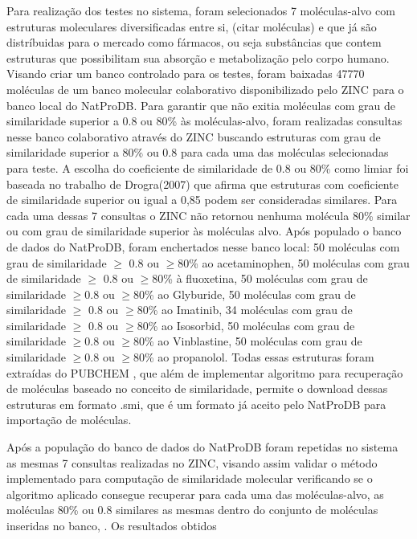 Para realização dos testes no sistema, foram selecionados 7 moléculas-alvo  com estruturas moleculares diversificadas entre si, (citar moléculas) e que já são distríbuidas para o mercado como fármacos, ou seja substâncias que contem estruturas que possibilitam sua absorção e metabolização pelo corpo humano. Visando criar um banco controlado para os testes, foram baixadas 47770 moléculas de um banco molecular colaborativo disponibilizado pelo ZINC \cite{irwin2005zinc} para o banco local do NatProDB. Para garantir que não exitia moléculas com grau de similaridade superior a 0.8 ou 80\% às moléculas-alvo, foram realizadas consultas nesse banco colaborativo através do ZINC buscando estruturas com grau de similaridade superior a 80\% ou 0.8 para cada uma das moléculas selecionadas para teste. A escolha do coeficiente de similaridade de 0.8 ou 80\% como limiar foi baseada no trabalho de Drogra(2007) que afirma que estruturas com coeficiente de similaridade superior ou igual a 0,85 podem ser consideradas similares. Para cada uma dessas 7 consultas o ZINC não retornou nenhuma molécula 80\% similar ou com grau de similaridade superior às moléculas alvo. Após populado o banco de dados do NatProDB, foram enchertados nesse banco local: 50 moléculas com grau de similaridade $\geq $ 0.8 ou $\geq $80\% ao acetaminophen, 50 moléculas com grau de similaridade $\geq $ 0.8 ou $\geq $80\% à fluoxetina, 50 moléculas com grau de similaridade $\geq $0.8 ou $\geq $80\% ao Glyburide, 50 moléculas com grau de similaridade $\geq $ 0.8 ou $\geq $80\% ao Imatinib, 34 moléculas com grau de similaridade $\geq $ 0.8 ou $\geq $80\% ao Isosorbid, 50 moléculas com grau de similaridade $\geq $0.8 ou $\geq $80\% ao Vinblastine, 50 moléculas com grau de similaridade $\geq $0.8 ou $\geq $80\% ao propanolol. Todas essas estruturas foram extraídas do PUBCHEM \cite{li2010pubchem}, que além de implementar algoritmo para recuperação de moléculas baseado no conceito de similaridade, permite o download dessas estruturas em formato .smi, que é um formato já aceito pelo NatProDB para importação de moléculas.

Após a população do banco de dados do NatProDB foram repetidas no sistema as mesmas 7 consultas realizadas no ZINC, visando assim validar o método implementado para computação de similaridade molecular verificando se o algoritmo aplicado consegue recuperar para cada uma das moléculas-alvo, as moléculas 80\% ou 0.8 similares as mesmas dentro do conjunto de moléculas inseridas no banco, . Os resultados obtidos   
   





   
